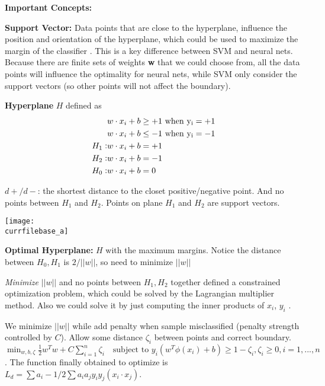 \documentclass[catalog.tex]{subfiles}
\begin{document}
\textbf{Important Concepts:} 

\begin{enumerate}
\item[•] \textbf{Support Vector:} Data points that are close to the hyperplane, influence the position and orientation of the hyperplane, which could be used to maximize the margin of the classifier \cite{ts}. This is a key difference between SVM and neural nets. Because there are finite sets of weights \textbf{w} that we could choose from, all the data points will influence the optimality for neural nets, while SVM only consider the support vectors (so other points will not affect the boundary).

\begin{minipage}[b]{0.65\linewidth}

\item[•]
\textbf{Hyperplane} $H$ defined as \cite{slides} 
\begin{align*}
&w\cdot x_i + b \geq +1\ \rm{when} \ y_i = +1 \\
&w\cdot x_i + b \leq -1\ \rm{when} \ y_i = -1 \\
H_1: &w\cdot x_i + b= +1\\
H_2: &w\cdot x_i + b= -1\\
H_0: &w\cdot x_i + b= 0\\
\end{align*}

$d+/d-$: the shortest distance to the closet positive/negative point. And no points between $H_1$ and $H_2$. Points on plane $H_1$ and $H_2$ are support vectors.  
\end{minipage}
\hfill
\begin{minipage}[b]{0.35\linewidth}
\texttt{[image: \\currfilebase\_a]}
\end{minipage}
\item[•] \textbf{Optimal Hyperplane:} $H$ with the maximum margins. Notice the distance between $H_0, H_1$ is $2/||w||$, so need to minimize $||w||$
\end{enumerate}

\textit{Minimize} $||w||$ and no points between $H_1, H_2$ together defined a constrained optimization problem, which could be solved by the Lagrangian multiplier method. Also we could solve it by just computing the inner products of $x_i$, $y_i$ \cite{slides}.

We minimize $||w||$ while add penalty when sample misclassified (penalty strength controlled by $C$). Allow some distance $\zeta_i$ between points and correct boundary. $\min_ {w, b, \zeta} \frac{1}{2} w^T w + C \sum_{i=1}^{n} \zeta_i \quad \textrm {subject to }  y_i (w^T \phi (x_i) + b) \geq 1 - \zeta_i, \zeta_i \geq 0, i=1, ..., n$ \cite{scikit}. The function finally obtained to optimize is $L_d=\sum a_i - 1/2 \sum a_i a_j y_i y_j (x_i \cdot x_j)$. 
\end{document}
